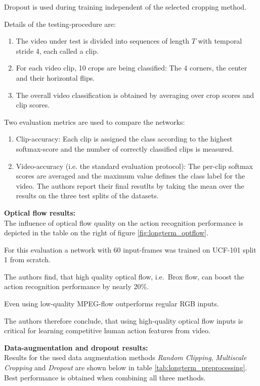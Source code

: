 Dropout is used during training independent of the selected cropping method.

Details of the testing-procedure are:
\begin{enumerate}
    \item The video under test is divided into sequences of length $T$ with temporal stride 4, each called a clip.
    \item For each video clip, 10 crops are being classified: The 4 corners, the center and their horizontal flips.
    \item The overall video classification is obtained by averaging over crop scores and clip scores.  
\end{enumerate}

Two evaluation metrics are used to compare the networks: 
\begin{enumerate}
    \item Clip-accuracy: Each clip is assigned the class according to the highest softmax-score and the number of correctly classified clips is measured.
    \item Video-accuracy (i.e. the standard evaluation protocol): The per-clip softmax scores are averaged and the maximum value defines the class label for the video. The authors report their final resutlts by taking the mean over the results on the three test splits of the datasets.
\end{enumerate}

\textbf{Optical flow results:} \\
The influence of optical flow quality on the action recognition performance is depicted in the table on the right of figure \ref{fig:longterm_optflow}.

For this evaluation a network with 60 input-frames was trained on UCF-101 split 1 from scratch.

The authors find, that high quality optical flow, i.e.\ Brox flow, can boost the action recognition performance by nearly 20\%.

Even using low-quality MPEG-flow outperforms regular RGB inputs.

The authors therefore conclude, that using high-quality optical flow inputs is critical for learning competitive human action features from video.

\textbf{Data-augmentation and dropout results:} \\
Results for the used data augmentation methods \textit{Random Clipping}, \textit{Multiscale Cropping} and \textit{Dropout} are shown below in table \ref{tab:longterm_preprocessing}.
Best performance is obtained when combining all three methods.

